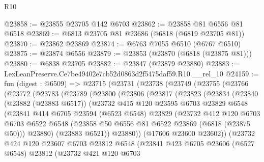 \begin{lexlean}{R10}
\begin{coremodule}
@23858 := @23855 @23705 @142 @6703
@23862 := @23858 @81 @6556 @81 @6518
@23869 := @6813 @23705 @81 @23686 (@6818 (@6819 @23705 @81))
@23870 := @23862 @23869
@23874 := @6763 @7055 @6510 (@6767 @6510)
@23875 := @23874 @6556
@23879 := @23853 (@23870 (@6818 (@23875 @81)))
@23880 := @6838 @23705
@23882 := @23847 (@23879 @23880)
@23883 := LexLeanPreserve.Ce7be49402e7cb52d0863d2f5475daf59.R10.__rel_10
@24159 := fun (digest : @6509) =>
  @23715
    (@23731
      (@23738
        (@23749
          (@23755
            (@23766
              (@23772
                (@23783
                  (@23789
                    (@23800
                      (@23806
                        (@23817
                          (@23823
                            (@23834
                              (@23840
                                (@23882 (@23883 @6517))
                                (@23732
                                  @415
                                  @120
                                  @23595
                                  @6703
                                  @23829
                                  @6548
                                  (@23841
                                    @414
                                    @6705
                                    @23594
                                    (@6523 @6548)
                                    @23829
                                    (@23732
                                      @412
                                      @120
                                      @6703
                                      @6703
                                      @6522
                                      @6548
                                      (@23858 @50 @6556 @81 @6522 @23869 (@6818 (@23875 @50)))
                                      @23880)
                                    (@23883 @6521))
                                  @23880))
                              (@17606 @23600 @23602))
                            (@23732
                              @424
                              @120
                              @23607
                              @6703
                              @23812
                              @6548
                              (@23841
                                @423
                                @6705
                                @23606
                                (@6527 @6548)
                                @23812
                                (@23732
                                  @421
                                  @120
                                  @6703

\end{coremodule}
\end{lexlean}
